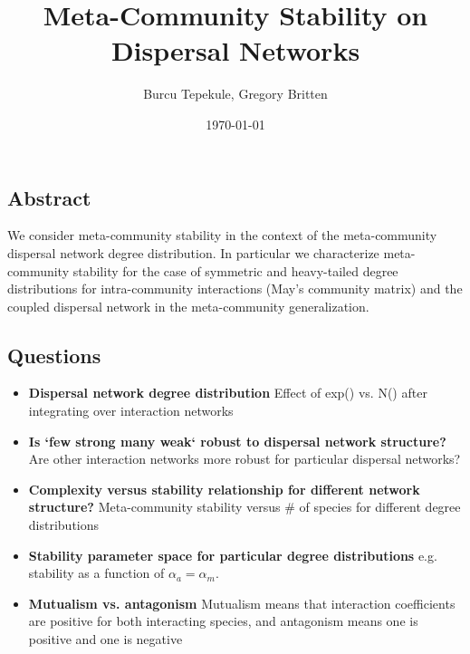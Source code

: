 \documentclass[12pt]{article}
\title{Meta-Community Stability on Dispersal Networks}
\author{\small{Burcu Tepekule, Gregory Britten}}
\date{\small{\printdayoff\today}}
\begin{document}
\maketitle 

\subsection*{Abstract}
We consider meta-community stability in the context of the meta-community dispersal network degree distribution. In particular we characterize meta-community stability for the case of symmetric and heavy-tailed degree distributions for intra-community interactions (May's community matrix) and the coupled dispersal network in the meta-community generalization. 

\subsection*{Questions}

\begin{itemize}

\item \textbf{Dispersal network degree distribution} Effect of exp() vs. N() after integrating over interaction networks
\item \textbf{Is `few strong many weak` robust to dispersal network structure?} Are other interaction networks more robust for particular dispersal networks? 
\item \textbf{Complexity versus stability relationship for different network structure?} Meta-community stability versus \# of species for different degree distributions
\item \textbf{Stability parameter space for particular degree distributions} e.g. stability  as a function of $\alpha_a = \alpha_m$.
\item \textbf{Mutualism vs. antagonism} Mutualism means that interaction coefficients are positive for both interacting species, and antagonism means one is positive and one is negative
\end{itemize}
\end{document}
